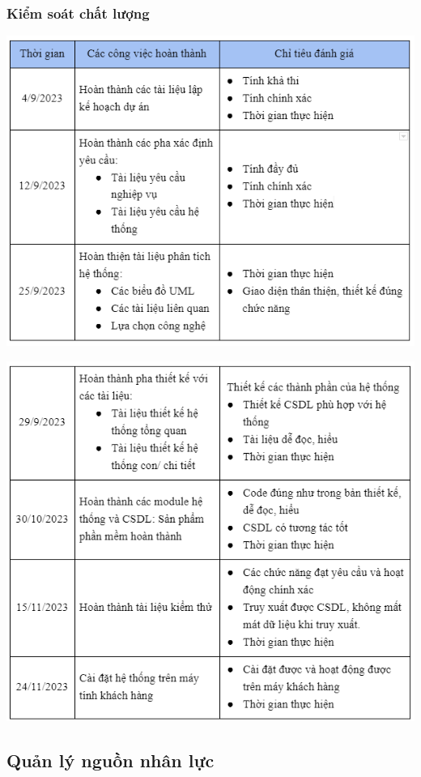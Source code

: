 \documentclass[12pt]{article}
\begin{document}
\subsubsection{Kiểm soát chất lượng}
\includegraphics[width=15cm]{II_5_5_1.png}
\par
\hspace{-0.6cm}\includegraphics[width=15cm]{II_5_5_2.png}
\vspace{0.5cm}

\subsection{Quản lý nguồn nhân lực}
\end{document}
